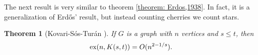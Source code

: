 \documentclass[12pt,twoside,a4paper,bibliography=totocnumbered]{book}
\numberwithin{equation}{section}
\newtheorem{theorem}             {Theorem}[section]
\newtheorem{corollary}	[theorem] {Corollary}
\theoremstyle{remark}
\def\ex{\mathop{\text{\rm ex}}\nolimits}
\begin{document}



The next result is very similar to theorem \ref{theorem: Erdos,1938}. In fact, it is a generalization of Erd\H{o}s' result, but instead counting cherries we count stars.
\begin{theorem}[{Kovari-Sós-Turán \cite{KoSoTu54}}]
If $G$ is a graph with $n$ vertices and $s \leq t$, then
$$ \ex(n, K(s,t)) = O (n^{2 - 1/s}). $$
\end{theorem}
\end{document}
